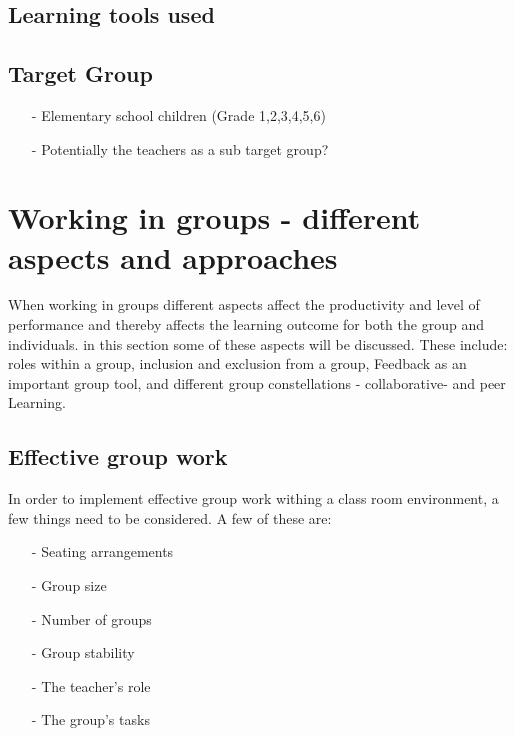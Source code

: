 \subsection{Learning tools used}%
	


\subsection{Target Group}

\begin{itemize}
	\item[-] Elementary school children (Grade 1,2,3,4,5,6)
	\item[-] Potentially the teachers as a sub target group?
\end{itemize}


\section{Working in groups - different aspects and approaches}




When working in groups different aspects affect the productivity and level of performance \cite{GodKlassekultur} and thereby affects the learning outcome for both the group and individuals. in this section some of these aspects will be discussed. These include: roles within a group, inclusion and exclusion from a group, Feedback as an important group tool, and different group constellations - collaborative- and peer Learning.

\subsection{Effective group work}
In order to implement effective group work withing a class room environment, a few things need to be considered\cite{collaborationSocialPedagogy}. A few of these are:
\begin{itemize}
	\item[-] Seating arrangements
	\item[-] Group size
	\item[-] Number of groups
	\item[-] Group stability
	\item[-] The teacher's role
	\item[-] The group's tasks
\end{itemize}

